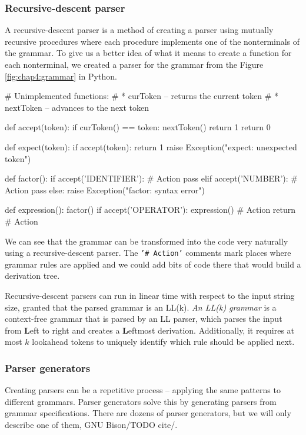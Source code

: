 \subsubsection*{Recursive-descent parser}
A recursive-descent parser is a method of creating a parser using mutually recursive procedures where each procedure implements one of the nonterminals
of the grammar. To give us a better idea of what it means to create a function for each nonterminal, we created a parser for the grammar from
the Figure \ref{fig:chap4:grammar} in Python.
\begin{code}
# Unimplemented functions:
#   * curToken -- returns the current token
#   * nextToken -- advances to the next token

def accept(token):
    if curToken() == token:
        nextToken()
        return 1
    return 0

def expect(token):
    if accept(token):
        return 1
    raise Exception("expect: unexpected token")

def factor():
    if accept('IDENTIFIER'):
        # Action
        pass
    elif accept('NUMBER'):
        # Action
        pass 
    else:
        raise Exception("factor: syntax error")

def expression():
    factor()
    if accept('OPERATOR'):
        expression()
        # Action
        return
    # Action 
\end{code}

We can see that the grammar can be transformed into the code very naturally using a recursive-descent parser. The \texttt{'\# Action'} comments mark places where
grammar rules are applied and we could add bits of code there that would build a derivation tree.

Recursive-descent parsers can run in linear time with respect to the input string size, granted that the parsed grammar is an LL(k). \emph{An LL(k) grammar} is
a context-free grammar that is parsed by an LL parser, which parses the input from \textbf{L}eft to right and creates a \textbf{L}eftmost derivation.
Additionally, it requires at most $k$ lookahead tokens to uniquely identify which rule should be applied next.

\subsubsection*{Parser generators}
Creating parsers can be a repetitive process -- applying the same patterns to different grammars. Parser generators solve this by generating parsers from grammar
specifications. There are dozens of parser generators, but we will only describe one of them, GNU Bison/TODO cite/.

